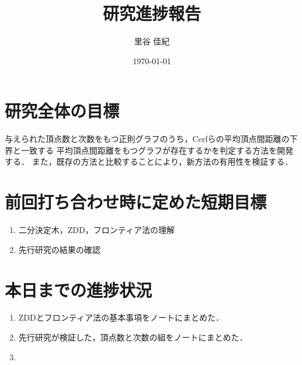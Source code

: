 \documentclass[11pt]{jarticle}
\title{研究進捗報告}
\author{里谷 佳紀}
\date{\today}
\begin{document}
%
\maketitle
\thispagestyle{empty}
%
\section{研究全体の目標}
与えられた頂点数と次数をもつ正則グラフのうち，Cerfらの平均頂点間距離の下界\cite{Cerf1974}と一致する
平均頂点間距離をもつグラフが存在するかを判定する方法を開発する．
また，既存の方法\cite{Yamamoto2016}と比較することにより，新方法の有用性を検証する．

\section{前回打ち合わせ時に定めた短期目標}
\begin{enumerate}
\item 二分決定木，ZDD，フロンティア法の理解
\item 先行研究の結果の確認
\end{enumerate}

\section{本日までの進捗状況}
\begin{enumerate}
\item ZDDとフロンティア法の基本事項をノートにまとめた．
\item 先行研究が検証した，頂点数と次数の組をノートにまとめた．
\item 
\end{enumerate}



\end{document}
